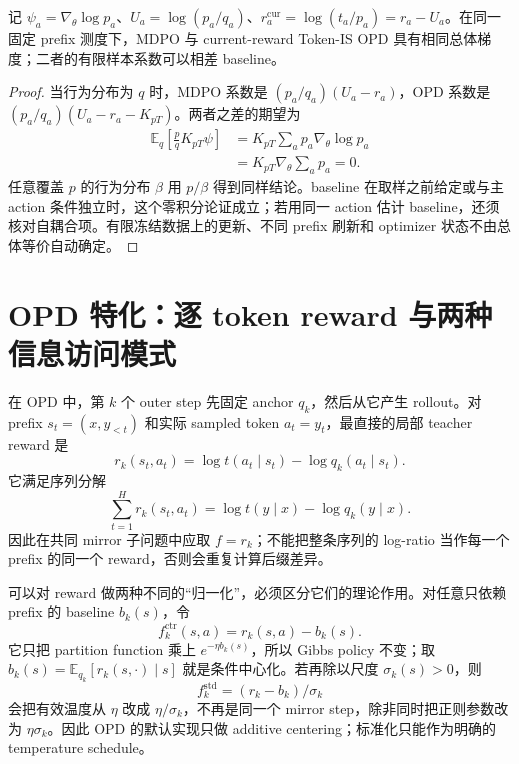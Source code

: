 \documentclass[lang=cn,scheme=chinese,openany]{../book/elegantbook}
\newcommand{\E}{\mathbb E}
\begin{document}
\begin{proposition}[$\eta=1$ 的 MDPO 与 Token-IS OPD]
\label{opd:eta-one-mdpo}
记 $\psi_a=\nabla_\theta\log p_a$、$U_a=\log(p_a/q_a)$、$r_a^{\mathrm{cur}}=\log(t_a/p_a)=r_a-U_a$。在同一固定 prefix 测度下，MDPO 与 current-reward Token-IS OPD 具有相同总体梯度；二者的有限样本系数可以相差 baseline。
\end{proposition}
\begin{proof}
当行为分布为 $q$ 时，MDPO 系数是 $(p_a/q_a)(U_a-r_a)$，OPD 系数是 $(p_a/q_a)(U_a-r_a-K_{pT})$。两者之差的期望为
\begin{align}
\E_q\left[\frac pqK_{pT}\psi\right]
&=K_{pT}\sum_a p_a\nabla_\theta\log p_a\\
&=K_{pT}\nabla_\theta\sum_a p_a=0.
\end{align}
任意覆盖 $p$ 的行为分布 $\beta$ 用 $p/\beta$ 得到同样结论。baseline 在取样之前给定或与主 action 条件独立时，这个零积分论证成立；若用同一 action 估计 baseline，还须核对自耦合项。有限冻结数据上的更新、不同 prefix 刷新和 optimizer 状态不由总体等价自动确定。
\end{proof}

\section{OPD 特化：逐 token reward 与两种信息访问模式}
\label{sec:ch2-opd-specialization}

在 OPD 中，第 $k$ 个 outer step 先固定 anchor $q_k$，然后从它产生 rollout。对 prefix $s_t=(x,y_{<t})$ 和实际 sampled token $a_t=y_t$，最直接的局部 teacher reward 是
\begin{equation}
\label{eq:ch2-opd-raw-reward}
r_k(s_t,a_t)=\log t(a_t\mid s_t)-\log q_k(a_t\mid s_t).
\end{equation}
它满足序列分解
\begin{equation}
\sum_{t=1}^H r_k(s_t,a_t)=\log t(y\mid x)-\log q_k(y\mid x).
\end{equation}
因此在共同 mirror 子问题中应取 $f=r_k$；不能把整条序列的 log-ratio 当作每一个 prefix 的同一个 reward，否则会重复计算后缀差异。

可以对 reward 做两种不同的“归一化”，必须区分它们的理论作用。对任意只依赖 prefix 的 baseline $b_k(s)$，令
\begin{equation}
\label{eq:ch2-opd-centered-reward}
f_k^{\mathrm{ctr}}(s,a)=r_k(s,a)-b_k(s).
\end{equation}
它只把 partition function 乘上 $e^{-\eta b_k(s)}$，所以 Gibbs policy 不变；取 $b_k(s)=\mathbb E_{q_k}[r_k(s,\cdot)\mid s]$ 就是条件中心化。若再除以尺度 $\sigma_k(s)>0$，则
\begin{equation}
f_k^{\mathrm{std}}=(r_k-b_k)/\sigma_k
\end{equation}
会把有效温度从 $\eta$ 改成 $\eta/\sigma_k$，不再是同一个 mirror step，除非同时把正则参数改为 $\eta\sigma_k$。因此 OPD 的默认实现只做 additive centering；标准化只能作为明确的 temperature schedule。
\end{document}
